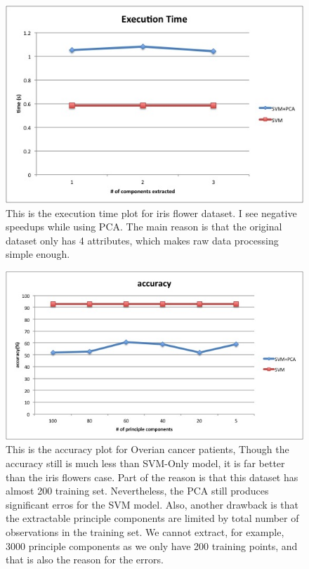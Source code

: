 \documentclass[11pt]{article}
\begin{document}
\begin{figure}[H]
\centering
\includegraphics[width=120mm]{iris_time.jpg}
\caption{ This is the execution time plot for iris flower dataset. I see negative speedups while using PCA. The main reason is that the original dataset only has 4 attributes, which makes raw data processing simple enough. \label{problem1Pic2}}
\end{figure}

\begin{figure}[H]
\centering
\includegraphics[width=120mm]{cancer_accuracy.jpg}
\caption{ This is the accuracy plot for Overian cancer patients, Though the accuracy still is much less than SVM-Only model, it is far better than the iris flowers case. Part of the reason is that this dataset has almost 200 training set. Nevertheless, the PCA still produces significant erros for the SVM model. Also, another drawback is that the extractable principle components are limited by total number of observations in the training set. We cannot extract, for example, 3000 principle components as we only have 200 training points, and that is also the reason for the errors. \label{problem1Pic2}}
\end{figure}
\end{document}
